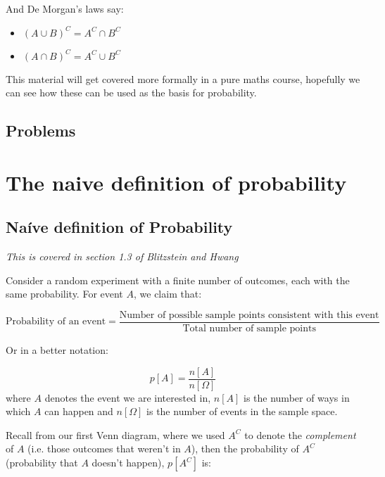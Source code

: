 \documentclass{book}
\begin{document}
And De Morgan's laws say:
\begin{itemize}
\item $(A \cup B)^C = A^C \cap B^C$
\item $(A \cap B)^C = A^C \cup B^C$
\end{itemize}



This material will get covered more formally in a pure maths course, hopefully we can see how these can be used as the basis for probability.



\section{Problems}
\begin{enumerate}



\end{enumerate}



\chapter{The naive definition of probability}

\section{Na\'ive definition of Probability}

\textit{This is covered in section 1.3 of Blitzstein and Hwang}

Consider a random experiment with a finite number of outcomes, each with the same probability.   For event $A$, we claim that:

\begin{displaymath}
\mbox{Probability of an event} = \frac{\mbox{Number of possible sample points consistent with this event}}{\mbox{Total number of sample points}}
\end{displaymath}

Or in a better notation:

\begin{equation}
p[A] = \frac{n[A]}{n[\Omega]}
\end{equation}
where $A$ denotes the event we are interested in, $n[A]$ is the number of ways in which $A$ can happen and $n[\Omega]$ is the number of events in the sample space.  


Recall from our first Venn diagram, where we used $A^C$ to denote the \emph{complement} of $A$ (i.e. those outcomes that weren't in $A$), then the probability of $A^C$ (probability that $A$ doesn't happen), $p[A^C]$ is:
\end{document}
